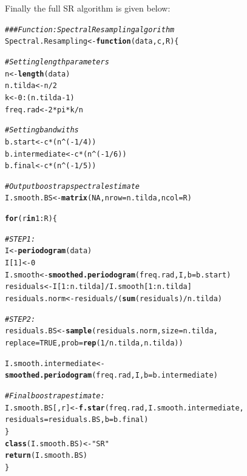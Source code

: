 \documentclass{article}\usepackage[]{graphicx}\usepackage[]{color}
\makeatletter
\newcommand{\hlnum}[1]{\textcolor[rgb]{0.686,0.059,0.569}{#1}}%
\newcommand{\hlstr}[1]{\textcolor[rgb]{0.192,0.494,0.8}{#1}}%
\newcommand{\hlcom}[1]{\textcolor[rgb]{0.678,0.584,0.686}{\textit{#1}}}%
\newcommand{\hlopt}[1]{\textcolor[rgb]{0,0,0}{#1}}%
\newcommand{\hlstd}[1]{\textcolor[rgb]{0.345,0.345,0.345}{#1}}%
\newcommand{\hlkwa}[1]{\textcolor[rgb]{0.161,0.373,0.58}{\textbf{#1}}}%
\newcommand{\hlkwb}[1]{\textcolor[rgb]{0.69,0.353,0.396}{#1}}%
\newcommand{\hlkwc}[1]{\textcolor[rgb]{0.333,0.667,0.333}{#1}}%
\newcommand{\hlkwd}[1]{\textcolor[rgb]{0.737,0.353,0.396}{\textbf{#1}}}%
\newenvironment{kframe}{%
 \def\at@end@of@kframe{}%
 \ifinner\ifhmode%
  \def\at@end@of@kframe{\end{minipage}}%
  \begin{minipage}{\columnwidth}%
 \fi\fi%
 \def\FrameCommand##1{\hskip\@totalleftmargin \hskip-\fboxsep
 \colorbox{shadecolor}{##1}\hskip-\fboxsep
     \hskip-\linewidth \hskip-\@totalleftmargin \hskip\columnwidth}%
 \MakeFramed {\advance\hsize-\width
   \@totalleftmargin\z@ \linewidth\hsize
   \@setminipage}}%
 {\par\unskip\endMakeFramed%
 \at@end@of@kframe}
\newenvironment{knitrout}{}{} %
\makeatother
\begin{document}
\newpage
Finally the full SR algorithm is given below:

\begin{knitrout}\footnotesize
{}\color{fgcolor}\begin{kframe}
\begin{alltt}
\hlcom{### Function: Spectral Resampling algorithm}
\hlstd{Spectral.Resampling} \hlkwb{<-} \hlkwa{function}\hlstd{(}\hlkwc{data}\hlstd{,} \hlkwc{c}\hlstd{,} \hlkwc{R}\hlstd{) \{}

  \hlcom{# Setting length parameters }
  \hlstd{n} \hlkwb{<-} \hlkwd{length}\hlstd{(data)}
  \hlstd{n.tilda} \hlkwb{<-} \hlstd{n}\hlopt{/}\hlnum{2}
  \hlstd{k} \hlkwb{<-} \hlnum{0}\hlopt{:}\hlstd{(n.tilda} \hlopt{-} \hlnum{1}\hlstd{)}
  \hlstd{freq.rad} \hlkwb{<-} \hlnum{2}\hlopt{*}\hlstd{pi}\hlopt{*}\hlstd{k}\hlopt{/}\hlstd{n}

  \hlcom{# Setting bandwiths}
  \hlstd{b.start} \hlkwb{<-} \hlstd{c} \hlopt{*} \hlstd{(n} \hlopt{^} \hlstd{(}\hlopt{-}\hlnum{1}\hlopt{/}\hlnum{4}\hlstd{))}
  \hlstd{b.intermediate} \hlkwb{<-} \hlstd{c} \hlopt{*} \hlstd{(n} \hlopt{^} \hlstd{(}\hlopt{-}\hlnum{1}\hlopt{/}\hlnum{6}\hlstd{))}
  \hlstd{b.final} \hlkwb{<-} \hlstd{c} \hlopt{*} \hlstd{(n} \hlopt{^} \hlstd{(}\hlopt{-}\hlnum{1}\hlopt{/}\hlnum{5}\hlstd{))}

  \hlcom{# Output boostrap spectral estimate}
  \hlstd{I.smooth.BS} \hlkwb{<-} \hlkwd{matrix}\hlstd{(}\hlnum{NA}\hlstd{,} \hlkwc{nrow} \hlstd{= n.tilda,} \hlkwc{ncol} \hlstd{= R)}

  \hlkwa{for}\hlstd{(r} \hlkwa{in} \hlnum{1}\hlopt{:}\hlstd{R) \{}

    \hlcom{# STEP 1:}
    \hlstd{I} \hlkwb{<-} \hlkwd{periodogram}\hlstd{(data)}
    \hlstd{I[}\hlnum{1}\hlstd{]} \hlkwb{<-} \hlnum{0}
    \hlstd{I.smooth} \hlkwb{<-} \hlkwd{smoothed.periodogram}\hlstd{(freq.rad, I,} \hlkwc{b} \hlstd{= b.start)}
    \hlstd{residuals} \hlkwb{<-} \hlstd{I[}\hlnum{1}\hlopt{:}\hlstd{n.tilda]}\hlopt{/}\hlstd{I.smooth[}\hlnum{1}\hlopt{:}\hlstd{n.tilda]}
    \hlstd{residuals.norm} \hlkwb{<-} \hlstd{residuals}\hlopt{/}\hlstd{(}\hlkwd{sum}\hlstd{(residuals)}\hlopt{/}\hlstd{n.tilda)}


    \hlcom{# STEP 2:}
    \hlstd{residuals.BS} \hlkwb{<-} \hlkwd{sample}\hlstd{(residuals.norm,} \hlkwc{size} \hlstd{= n.tilda,}
                           \hlkwc{replace} \hlstd{=} \hlnum{TRUE}\hlstd{,} \hlkwc{prob} \hlstd{=} \hlkwd{rep}\hlstd{(}\hlnum{1}\hlopt{/}\hlstd{n.tilda, n.tilda))}

    \hlstd{I.smooth.intermediate} \hlkwb{<-} \hlkwd{smoothed.periodogram}\hlstd{(freq.rad, I,} \hlkwc{b} \hlstd{= b.intermediate)}

    \hlcom{# Final boostrap estimate: }
    \hlstd{I.smooth.BS[, r]} \hlkwb{<-} \hlkwd{f.star}\hlstd{(freq.rad, I.smooth.intermediate,}
                               \hlkwc{residuals} \hlstd{= residuals.BS,} \hlkwc{b} \hlstd{= b.final)}
  \hlstd{\}}
  \hlkwd{class}\hlstd{(I.smooth.BS)} \hlkwb{<-} \hlstr{"SR"}
  \hlkwd{return}\hlstd{(I.smooth.BS)}
\hlstd{\}}
\end{alltt}
\end{kframe}
\end{knitrout}
\end{document}
